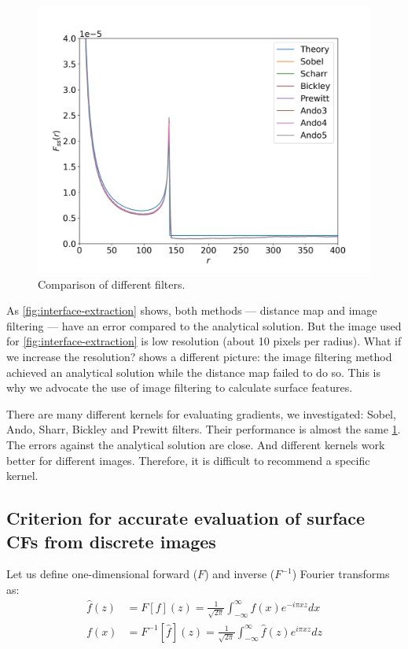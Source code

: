 \documentclass[reprint,amsmath,amssymb,aps,pre]{revtex4-1}
\begin{document}
\begin{figure}[ht]
  \centering
  \includegraphics[width=0.99\linewidth]{images/kernels.png}
  \caption{Comparison of different filters.}
  \label{fig:kernels}
\end{figure}

As \cref{fig:interface-extraction} shows, 
both methods --- distance map and image filtering --- 
have an error compared to the analytical solution.
But the image used for \cref{fig:interface-extraction} is low resolution (about 10 pixels per radius).
What if we increase the resolution?
 shows a different picture:
the image filtering method achieved an analytical solution 
while the distance map failed to do so.
This is why we advocate the use of image filtering to calculate surface features.


There are many different kernels for evaluating gradients,
we investigated: Sobel, Ando, Sharr, Bickley and Prewitt filters.
Their performance is almost the same \cref{fig:kernels}.
The errors against the analytical solution are close.
And different kernels work better for different images.
Therefore, it is difficult to recommend a specific kernel.

\subsection{Criterion for accurate evaluation of surface CFs from discrete images}
\label{sec:crit}
Let us define one-dimensional forward ($F$) and inverse ($F^{-1}$) Fourier
transforms as:
\begin{align}
  \hat{f}(z) &= F[f](z) = \frac{1}{\sqrt{2\pi}}\int_{-\infty}^{\infty} f(x)
  e^{-i\pi xz} dx \label{eq:fourier-forward} \\
  f(x) &= F^{-1}[\hat{f}](z) = \frac{1}{\sqrt{2\pi}}\int_{-\infty}^{\infty} \hat{f}(z)
  e^{i\pi xz} dz \label{eq:fourier-backward}
\end{align}
\end{document}
